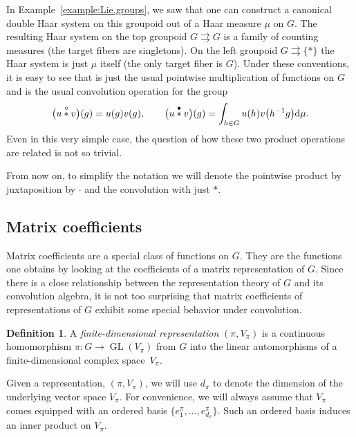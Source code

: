 \documentclass[10pt,a4paper]{amsart}
\numberwithin{equation}{section}
\theoremstyle{definition}
\newtheorem{Definition}[Theorem]{Definition}
\newcommand{\stardot}{\overset{{\bullet}}{*}}
\newcommand{\starcirc}{\overset{\circ}{*}}
\newcommand{\inv}{^{-1}}
\newcommand{\grpd}{\rightrightarrows}
\DeclareMathOperator{\GL}{GL}
\begin{document}
In Example~\ref{example:Lie.groups}, we saw that one can construct a canonical double Haar system on this groupoid out of a Haar measure $ \mu $ on $ G $. The resulting Haar system on the top groupoid $ G \grpd G $ is a family of counting measures (the target fibers are singletons). On the left groupoid $ G \grpd \{ * \} $ the Haar system is just $ \mu $ itself (the only target fiber is $ G $). Under these conventions, it is easy to see that \smash{$ \starcirc $} is just the usual pointwise multiplication of functions on $ G $ and \smash{$ \stardot $} is the usual convolution operation for the group
\[ \big(u \starcirc v\big) (g) = u(g) v(g), \qquad \big(u \stardot v \big) (g) = \int_{h \in G } u(h) v\big(h\inv g\big) {\rm d} \mu.\]
Even in this very simple case, the question of how these two product operations are related is not so trivial.

From now on, to simplify the notation we will denote the pointwise product \smash{$ \starcirc $} by juxtaposition by $ \cdot $ and the convolution \smash{$ \stardot $} with just $ * $.

\subsection{Matrix coefficients}\label{subsection:matrix.coefficients}

Matrix coefficients are a special class of functions on $ G $. They are the functions one obtains by looking at the coefficients of a matrix representation of $ G $. Since there is a close relationship between the representation theory of $ G $ and its convolution algebra, it is not too surprising that matrix coefficients of representations of $ G $ exhibit some special behavior under convolution.
\begin{Definition} A \textit{finite-dimensional representation} $(\pi,V_\pi)$ is a continuous homomorphism ${\pi\colon G\rightarrow \GL(V_\pi)}$ from $G$ into the linear automorphisms of a finite-dimensional complex space~$V_{\pi}$.
\end{Definition}
Given a representation, $ (\pi, V_\pi) $, we will use $ d_\pi $ to denote the dimension of the underlying vector space $ V_\pi $. For convenience, we will always assume that $ V_\pi $ comes equipped with an ordered basis $ \{ e^\pi_1, \ldots, e^\pi_{d_\pi} \} $. Such an ordered basis induces an inner product on $ V_\pi $.
\end{document}
